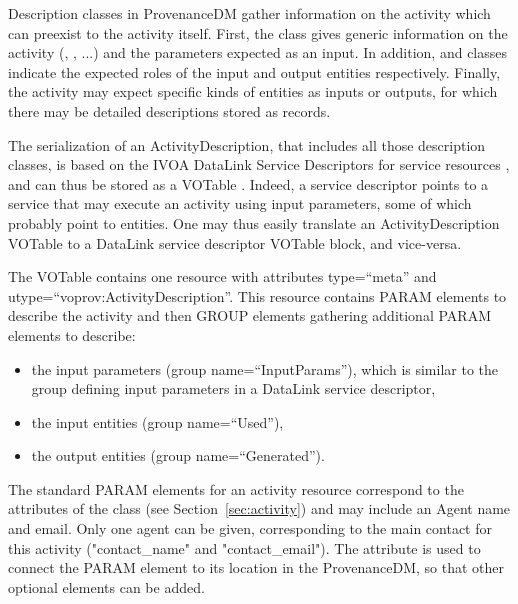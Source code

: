 

Description classes in ProvenanceDM gather information on the activity which can preexist to the activity itself.
First, the  class gives generic information on the activity (, , ...) and the parameters expected as an input. In addition,  and  classes indicate the expected roles of the input and output entities respectively. Finally, the activity may expect specific kinds of entities as inputs or outputs, for which there may be detailed descriptions stored as  records.

The serialization of an ActivityDescription, that includes all those description classes, is based on the IVOA DataLink Service Descriptors for service resources \citep{std:Datalink}, and can thus be stored as a VOTable \citep{std:VOTABLE}. Indeed, a service descriptor points to a service that may execute an activity using input parameters, some of which probably point to entities. One may thus easily translate an ActivityDescription VOTable to a DataLink service descriptor VOTable block, and vice-versa.

The VOTable contains one resource with attributes type=``meta'' and utype=``voprov:ActivityDescription''. This resource contains PARAM elements to describe the activity and then GROUP elements gathering additional PARAM elements to describe:
\begin{itemize}
 \item the input parameters (group name=``InputParams''), which is similar to the group defining input parameters in a DataLink service descriptor,
 \item the input entities (group name=``Used''),
 \item the output entities (group name=``Generated''). 
 \end{itemize}
 

The standard PARAM elements for an activity resource correspond to the attributes of the  class (see Section~\ref{sec:activity}) and may include an Agent name and email. Only one agent can be given, corresponding to the main contact for this activity ("contact\_name" and "contact\_email"). 
The  attribute is used to connect the PARAM element to its location in the ProvenanceDM, so that other optional elements can be added.

